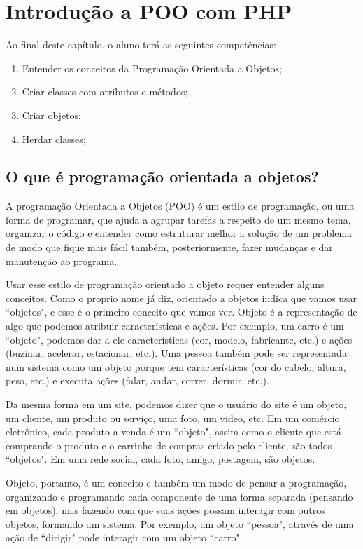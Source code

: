 \chapter{Introdução a POO com PHP}
\label{introducao-poo-php}

Ao final deste capítulo, o aluno terá as seguintes competências:
\begin{enumerate}
    \item Entender os conceitos da Programação Orientada a Objetos;
    \item Criar classes com atributos e métodos;
    \item Criar objetos;
    \item Herdar classes;
\end{enumerate}

\section{O que é programação orientada a objetos?}
\label{o-que-eh-poo}

A programação Orientada a Objetos (POO) é um estilo de programação, ou uma forma de programar, 
que ajuda a agrupar tarefas a respeito de um mesmo tema, organizar o código e entender como 
estruturar melhor a solução de um problema de modo que fique mais fácil também, posteriormente, 
fazer mudanças e dar manutenção ao programa. 

Usar esse estilo de programação orientado a objeto requer entender alguns conceitos. Como o 
proprio nome já diz, orientado a objetos indica que vamos usar ``objetos", e esse é o primeiro 
conceito que vamos ver. Objeto é a representação de algo que podemos atribuir características 
e ações. Por exemplo, um carro é um ``objeto", podemos dar a ele características (cor, modelo, 
fabricante, etc.) e ações (buzinar, acelerar, estacionar, etc.). Uma pessoa também pode ser 
representada num sistema como um objeto porque tem características (cor do cabelo, altura, 
peso, etc.) e executa ações (falar, andar, correr, dormir, etc.). 

Da mesma forma em um site, podemos dizer que o usuário do site é um objeto, um cliente, um 
produto ou serviço, uma foto, um video, etc. Em um comércio eletrônico, cada produto a venda 
é um ``objeto", assim como o cliente que está comprando o produto e o carrinho de compras 
criado pelo cliente, são todos ``objetos". Em uma rede social, cada foto, amigo, postagem, 
são objetos. 

Objeto, portanto, é um conceito e também um modo de pensar a programação, organizando e 
programando cada componente de uma forma separada (pensando em objetos), mas fazendo com 
que suas ações possam interagir com outros objetos, formando um sistema. Por exemplo, um 
objeto ``pessoa", através de uma ação de ``dirigir" pode interagir com um objeto ``carro".


